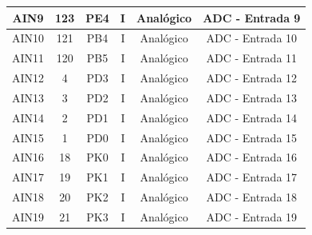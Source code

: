 \begin{center}
\begin{longtable}{|c|c|c|c|c|c|}
	\hline
	AIN9                        & 123                            & PE4                               & I                           & Analógico                     & ADC - Entrada 9                             \\
	\hline
	AIN10                       & 121                            & PB4                               & I                           & Analógico                     & ADC - Entrada 10                            \\
	\hline
	AIN11                       & 120                            & PB5                               & I                           & Analógico                     & ADC - Entrada 11                            \\
	\hline
	AIN12                       & 4                              & PD3                               & I                           & Analógico                     & ADC - Entrada 12                            \\
	\hline
	AIN13                       & 3                              & PD2                               & I                           & Analógico                     & ADC - Entrada 13                            \\
	\hline
	AIN14                       & 2                              & PD1                               & I                           & Analógico                     & ADC - Entrada 14                            \\
	\hline
	AIN15                       & 1                              & PD0                               & I                           & Analógico                     & ADC - Entrada 15                            \\
	\hline
	AIN16                       & 18                             & PK0                               & I                           & Analógico                     & ADC - Entrada 16                            \\
	\hline
	AIN17                       & 19                             & PK1                               & I                           & Analógico                     & ADC - Entrada 17                            \\
	\hline
	AIN18                       & 20                             & PK2                               & I                           & Analógico                     & ADC - Entrada 18                            \\
	\hline
	AIN19                       & 21                             & PK3                               & I                           & Analógico                     & ADC - Entrada 19                            \\

\end{longtable}
\end{center}
